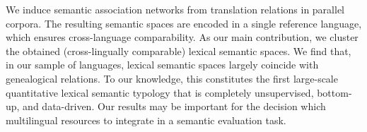 We induce semantic association networks from translation relations in parallel corpora. The resulting semantic spaces are encoded in a single reference language, which ensures cross-language comparability. As our main contribution, we cluster the obtained (cross-lingually comparable) lexical semantic spaces. We find that, in our sample of languages, lexical semantic spaces largely coincide with genealogical relations. To our knowledge, this constitutes the first large-scale quantitative lexical semantic typology that is completely unsupervised, bottom-up, and data-driven. Our results may be important for the decision which multilingual resources to integrate in a semantic evaluation task.
